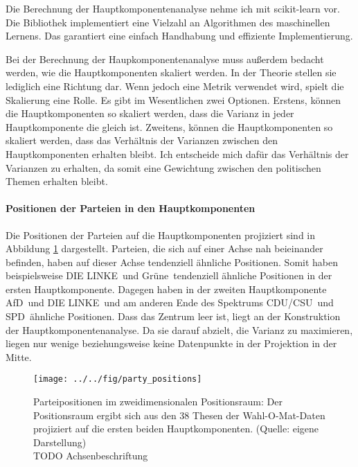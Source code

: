 Die Berechnung der Hauptkomponentenanalyse nehme ich mit scikit-learn \citep{scikit-learn} vor. Die Bibliothek implementiert eine Vielzahl an Algorithmen des maschinellen Lernens. Das garantiert eine einfach Handhabung und effiziente Implementierung.

Bei der Berechnung der Haupkomponentenanalyse muss außerdem bedacht werden, wie die Hauptkomponenten skaliert werden. In der Theorie stellen sie lediglich eine Richtung dar. Wenn jedoch eine Metrik verwendet wird, spielt die Skalierung eine Rolle. Es gibt im Wesentlichen zwei Optionen. Erstens, können die Hauptkomponenten so skaliert werden, dass die Varianz in jeder Hauptkomponente die gleich ist. Zweitens, können die Hauptkomponenten so skaliert werden, dass das Verhältnis der Varianzen zwischen den Hauptkomponenten erhalten bleibt. Ich entscheide mich dafür das Verhältnis der Varianzen zu erhalten, da somit eine Gewichtung zwischen den politischen Themen erhalten bleibt.

\paragraph{Positionen der Parteien in den Hauptkomponenten}
Die Positionen der Parteien auf die Hauptkomponenten projiziert sind in Abbildung \ref{fig:party-positions-pca} dargestellt. Parteien, die sich auf einer Achse nah beieinander befinden, haben auf dieser Achse tendenziell ähnliche Positionen. Somit haben beispielsweise \glqq DIE LINKE\grqq\ und \glqq Grüne\grqq\ tendenziell ähnliche Positionen in der ersten Hauptkomponente. Dagegen haben in der zweiten Hauptkomponente \glqq AfD\grqq\ und \glqq DIE LINKE\grqq\ und am anderen Ende des Spektrums \glqq CDU/CSU\grqq\ und \glqq SPD\grqq\ ähnliche Positionen. Dass das Zentrum leer ist, liegt an der Konstruktion der Hauptkomponentenanalyse. Da sie darauf abzielt, die Varianz zu maximieren, liegen nur wenige beziehungsweise keine Datenpunkte in der Projektion in der Mitte.

\begin{figure}[htb]
	\centering
	\texttt{[image: ../../fig/party\_positions]}
	\caption{Parteipositionen im zweidimensionalen Positionsraum: Der Positionsraum ergibt sich aus den 38 Thesen der Wahl-O-Mat-Daten \citep{WahlOMat,Bolte2022QualOMat} projiziert auf die ersten beiden Hauptkomponenten. (Quelle: eigene Darstellung)\\TODO Achsenbeschriftung}
	\label{fig:party-positions-pca}
\end{figure}

